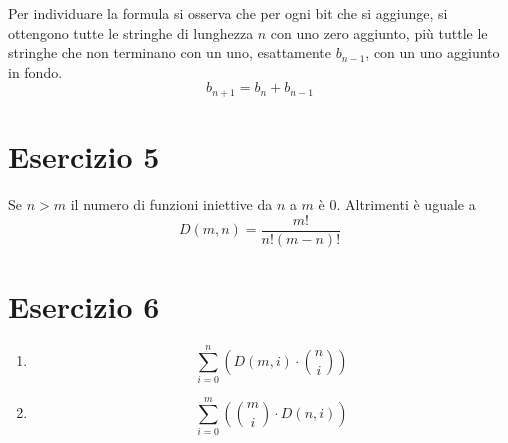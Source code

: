 \documentclass{article}
\begin{document}
Per individuare la formula si osserva che per ogni bit che si aggiunge, si ottengono tutte le stringhe di lunghezza \(n\) con uno zero aggiunto, più tuttle le stringhe che non terminano con un uno, esattamente \(b_{n - 1}\), con un uno aggiunto in fondo.
\[b_{n+1} = b_n + b_{n - 1}\]

\section{Esercizio 5}
Se \(n > m\) il numero di funzioni iniettive da \(n\) a \(m\) è 0. Altrimenti è uguale a
\[D(m, n) = \frac{m!}{n!(m - n)!}\]

\section{Esercizio 6}
\begin{enumerate}
    \item \[\sum_{i = 0}^n \left( D(m,i) \cdot \binom{n}{i} \right)\]
    \item \[\sum_{i = 0}^m \left( \binom{m}{i} \cdot D(n,i) \right)\]
\end{enumerate}
\end{document}
